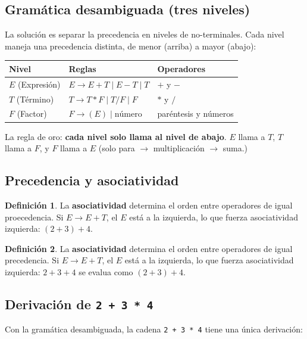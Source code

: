 \documentclass[10pt,a4paper]{article}
\theoremstyle{definition}
\newtheorem{definicion}{Definición}[section]
\begin{document}
\subsection{Gramática desambiguada (tres niveles)}

La solución es separar la precedencia en niveles de  no-terminales.
Cada nivel maneja una precedencia distinta, de menor (arriba) a mayor (abajo):

\begin{center}
\begin{tabular}{lll}
    \toprule
    Nivel & Reglas & Operadores \\
    \midrule
    $E$ (Expresión) & $E \to E + T \mid E - T \mid T$ & $+$ y $-$ \\
    $T$ (Término)   & $T \to T * F \mid T / F \mid F$ & $*$ y $/$ \\
    $F$ (Factor)    & $F \to (E) \mid \text{número}$  & paréntesis y números \\
    \bottomrule
\end{tabular}
\end{center}

La regla de oro: \textbf{cada nivel solo llama al nivel de abajo}. $E$ llama a $T$, $T$ llama a $F$, y $F$ llama a $E$ (solo para $\to$ multiplicación $\to$ suma.)

\subsection{Precedencia y asociatividad}

\begin{definicion}
La \textbf{asociatividad} determina el orden entre operadores de igual proecedencia. Si $E \to E + T$, el $E$ está a la izquierda, lo que fuerza asociatividad izquierda:
$(2 + 3) + 4$.
\end{definicion}

\begin{definicion}
    La \textbf{asociatividad} determina el orden entre operadores de igual precedencia. Si $E \to E + T$, el $E$ está
    a la izquierda, lo que fuerza asociatividad izquierda:
    $2 + 3 + 4$ se evalua como $(2 + 3) + 4$.
\end{definicion}


\subsection{Derivación de \texttt{2 + 3 * 4}}

Con la gramática desambiguada, la cadena \texttt{2 + 3 * 4} tiene una única derivación:
\end{document}
